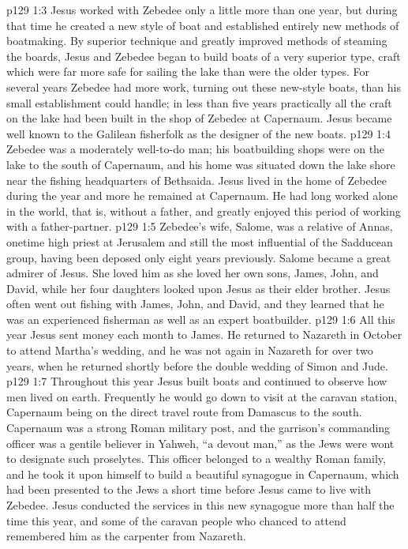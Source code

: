 \vs p129 1:3 Jesus worked with Zebedee only a little more than one year, but during that time he created a new style of boat and established entirely new methods of boatmaking. By superior technique and greatly improved methods of steaming the boards, Jesus and Zebedee began to build boats of a very superior type, craft which were far more safe for sailing the lake than were the older types. For several years Zebedee had more work, turning out these new\hyp{}style boats, than his small establishment could handle; in less than five years practically all the craft on the lake had been built in the shop of Zebedee at Capernaum. Jesus became well known to the Galilean fisherfolk as the designer of the new boats.
\vs p129 1:4 Zebedee was a moderately well\hyp{}to\hyp{}do man; his boatbuilding shops were on the lake to the south of Capernaum, and his home was situated down the lake shore near the fishing headquarters of Bethsaida. Jesus lived in the home of Zebedee during the year and more he remained at Capernaum. He had long worked alone in the world, that is, without a father, and greatly enjoyed this period of working with a father\hyp{}partner.
\vs p129 1:5 Zebedee’s wife, Salome, was a relative of Annas, onetime high priest at Jerusalem and still the most influential of the Sadducean group, having been deposed only eight years previously. Salome became a great admirer of Jesus. She loved him as she loved her own sons, James, John, and David, while her four daughters looked upon Jesus as their elder brother. Jesus often went out fishing with James, John, and David, and they learned that he was an experienced fisherman as well as an expert boatbuilder.
\vs p129 1:6 \pc All this year Jesus sent money each month to James. He returned to Nazareth in October to attend Martha’s wedding, and he was not again in Nazareth for over two years, when he returned shortly before the double wedding of Simon and Jude.
\vs p129 1:7 \pc Throughout this year Jesus built boats and continued to observe how men lived on earth. Frequently he would go down to visit at the caravan station, Capernaum being on the direct travel route from Damascus to the south. Capernaum was a strong Roman military post, and the garrison’s commanding officer was a gentile believer in Yahweh, “a devout man,” as the Jews were wont to designate such proselytes. This officer belonged to a wealthy Roman family, and he took it upon himself to build a beautiful synagogue in Capernaum, which had been presented to the Jews a short time before Jesus came to live with Zebedee. Jesus conducted the services in this new synagogue more than half the time this year, and some of the caravan people who chanced to attend remembered him as the carpenter from Nazareth.
